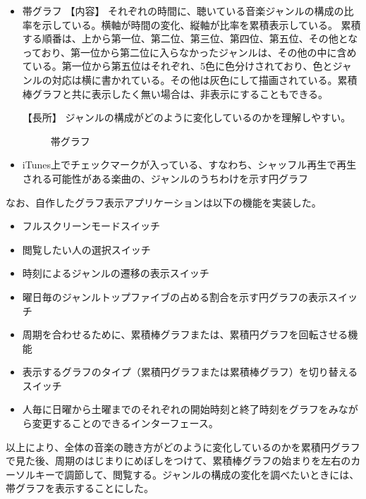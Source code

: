 \documentclass{jsarticle}
\begin{document}
\begin{itemize}
\item
帯グラフ
【内容】
それぞれの時間に、聴いている音楽ジャンルの構成の比率を示している。横軸が時間の変化、縦軸が比率を累積表示している。
累積する順番は、上から第一位、第二位、第三位、第四位、第五位、その他となっており、第一位から第二位に入らなかったジャンルは、その他の中に含めている。第一位から第五位はそれぞれ、5色に色分けされており、色とジャンルの対応は横に書かれている。その他は灰色にして描画されている。累積棒グラフと共に表示したく無い場合は、非表示にすることもできる。

【長所】
ジャンルの構成がどのように変化しているのかを理解しやすい。


\begin{figure}[htbp]
\begin{center}
\caption{帯グラフ}
\end{center}
\end{figure}

\item
iTunes上でチェックマークが入っている、すなわち、シャッフル再生で再生される可能性がある楽曲の、ジャンルのうちわけを示す円グラフ


\end{itemize}



なお、自作したグラフ表示アプリケーションは以下の機能を実装した。
\begin{itemize}
\item
フルスクリーンモードスイッチ
\item
閲覧したい人の選択スイッチ
\item
時刻によるジャンルの遷移の表示スイッチ
\item
曜日毎のジャンルトップファイブの占める割合を示す円グラフの表示スイッチ
\item
周期を合わせるために、累積棒グラフまたは、累積円グラフを回転させる機能
\item
表示するグラフのタイプ（累積円グラフまたは累積棒グラフ）を切り替えるスイッチ
\item
人毎に日曜から土曜までのそれぞれの開始時刻と終了時刻をグラフをみながら変更することのできるインターフェース。
\end{itemize}

以上により、全体の音楽の聴き方がどのように変化しているのかを累積円グラフで見た後、周期のはじまりにめぼしをつけて、累積棒グラフの始まりを左右のカーソルキーで調節して、閲覧する。ジャンルの構成の変化を調べたいときには、帯グラフを表示することにした。
\end{document}
